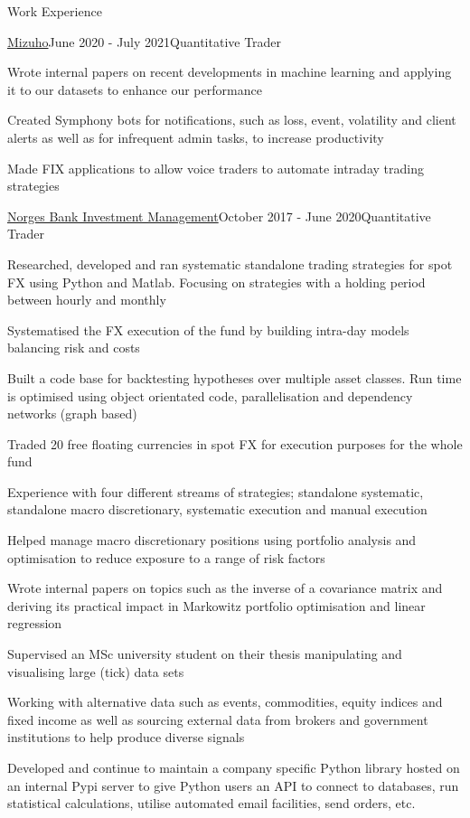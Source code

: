 \documentclass{resume} %
\begin{document}
\begin{rSection}{Work Experience}
\begin{rSubsection}{\href{https://www.mizuhogroup.com/bank/}{Mizuho}}{June 2020 - July 2021}{Quantitative Trader}{}
	\item Wrote internal papers on recent developments in machine learning and applying it to our datasets to enhance our performance
	\item Created Symphony bots for notifications, such as loss, event, volatility and client alerts as well as for infrequent admin tasks, to increase productivity
	\item Made FIX applications to allow voice traders to automate intraday trading strategies
	\fi
\end{rSubsection}
\begin{rSubsection}{\href{https://www.nbim.no/}{Norges Bank Investment Management}}{October 2017 - June 2020}{Quantitative Trader}{}
	\item Researched, developed and ran systematic standalone trading strategies for spot FX using Python and Matlab. Focusing on strategies with a holding period between hourly and monthly
	\item Systematised the FX execution of the fund by building intra-day models balancing risk and costs
	\item Built a code base for backtesting hypotheses over multiple asset classes. Run time is optimised using object orientated code, parallelisation and dependency networks (graph based)
	\iffalse
	\item Traded 20 free floating currencies in spot FX for execution purposes for the whole fund
	\item Experience with four different streams of strategies; standalone systematic, standalone macro discretionary, systematic execution and manual execution
	\item Helped manage macro discretionary positions using portfolio analysis and optimisation to reduce exposure to a range of risk factors
	\item Wrote internal papers on topics such as the inverse of a covariance matrix and deriving its practical impact in Markowitz portfolio optimisation and linear regression
	\item Supervised an MSc university student on their thesis manipulating and visualising large (tick) data sets
	\item Working with alternative data such as events, commodities, equity indices and fixed income as well as sourcing external data from brokers and government institutions to help produce diverse signals
	\item Developed and continue to maintain a company specific Python library hosted on an internal Pypi server to give Python users an API to connect to databases, run statistical calculations, utilise automated email facilities, send orders, etc.

\end{rSubsection}
\end{rSection}
\end{document}

